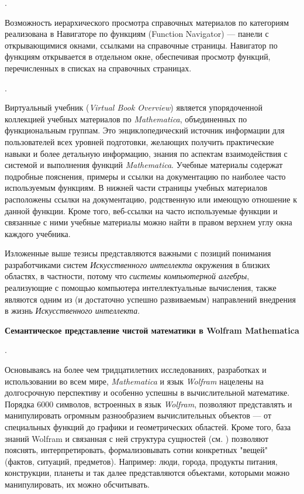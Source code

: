 .

Возможность иерархического просмотра справочных материалов по категориям реализована в Навигаторе по функциям (Function Navigator) --- панели с открывающимися окнами, ссылками на справочные страницы. Навигатор по функциям открывается в отдельном окне, обеспечивая просмотр функций, перечисленных в списках на справочных страницах.

. 

Виртуальный учебник (\textit{Virtual Book Overview}) является упорядоченной коллекцией учебных материалов по \textit{Mathematica}, объединенных по функциональным группам. Это энциклопедический источник информации для пользователей всех уровней подготовки, желающих получить практические навыки и более детальную информацию, знания по аспектам взаимодействия с системой и выполнения функций \textit{Mathematica}.
Учебные материалы содержат подробные пояснения, примеры и ссылки на документацию по наиболее часто используемым функциям. В нижней части страницы учебных материалов расположены ссылки на документацию, родственную или имеющую отношение к данной функции. Кроме того, веб-ссылки на часто используемые функции и связанные с ними учебные материалы можно найти в правом верхнем углу окна каждого учебника.

Изложенные выше тезисы представляются важными с позиций понимания разработчиками систем \textit{Искусственного интеллекта} окружения в близких областях, в частности, потому что \textit{системы компьютерной алгебры}, реализующие с помощью компьютера интеллектуальные вычисления, также являются одним из (и достаточно успешно развиваемым) направлений внедрения в жизнь \textit{Искусственного интеллекта}.

\textbf{Семантическое представление чистой математики в Wolfram Mathematica}

. 

Основываясь на более чем тридцатилетних исследованиях, разработках и использовании во всем мире, \textit{Mathematica} и язык \textit{Wolfram} нацелены на долгосрочную перспективу и особенно успешны в вычислительной математике. Порядка 6000 символов, встроенных в язык \textit{Wolfram}, позволяют представлять и манипулировать огромным разнообразием вычислительных объектов --- от специальных функций до графики и геометрических областей. Кроме того, база знаний Wolfram и связанная с ней структура сущностей (см. ) позволяют пояснять, интерпретировать, формализовывать сотни конкретных "вещей"{} (фактов, ситуаций, предметов). Например: люди, города, продукты питания, конструкции, планеты и так далее представляются объектами, которыми можно манипулировать, их можно обсчитывать.

